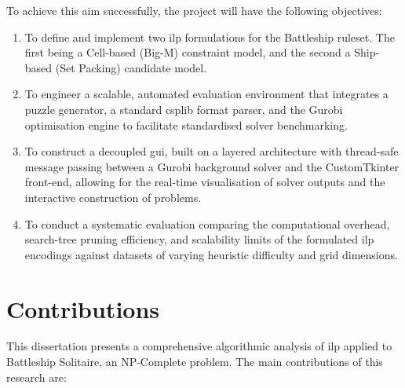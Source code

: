 To achieve this aim successfully, the project will have the following objectives:

\begin{enumerate}[label=\textbf{O\arabic*:}, leftmargin=*]
  \item To define and implement two \gls{ilp} formulations for the Battleship ruleset. The first being a Cell-based (Big-M) constraint model, and the second a Ship-based (Set Packing) candidate model.
  \item To engineer a scalable, automated evaluation environment that integrates a puzzle generator, a standard \gls{csplib} format parser, and the Gurobi optimisation engine to facilitate standardised solver benchmarking.
  \item To construct a decoupled \gls{gui}, built on a layered architecture with thread-safe message passing between a Gurobi background solver and the CustomTkinter front-end, allowing for the real-time visualisation of solver outputs and the interactive construction of problems.
  \item To conduct a systematic evaluation comparing the computational overhead, search-tree pruning efficiency, and scalability limits of the formulated \gls{ilp} encodings against datasets of varying heuristic difficulty and grid dimensions. 
\end{enumerate}


\section{Contributions}\label{sec:contributions}

This dissertation presents a comprehensive algorithmic analysis of \gls{ilp} applied to Battleship Solitaire, an NP-Complete problem. The main contributions of this research are:

